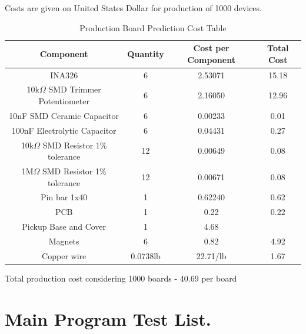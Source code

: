 Costs are given on United States Dollar for production of 1000 devices.\\
\begin{table}[htb]
  \begin{center}
    \ABNTEXreducedfont
    \caption[Production Board Prediction Cost Table]{Production Board Prediction Cost Table}
    \label{Production-cost}
    \begin{tabular}{c|c|c|c}
      \textbf{Component} & \textbf{Quantity} & \textbf{Cost per Component} & \textbf{Total Cost} \\
     \hline
     \hline
    INA326 & 6 & 2.53071 & 15.18\\ \hline
    10k$\Omega$ SMD Trimmer Potentiometer & 6 & 2.16050 & 12.96 \\ \hline
    10nF SMD Ceramic Capacitor & 6 & 0.00233 & 0.01 \\ \hline
    100nF Electrolytic Capacitor & 6 & 0.04431 & 0.27 \\ \hline
    10k$\Omega$ SMD Resistor 1$\%$ tolerance & 12 & 0.00649 & 0.08 \\ \hline
    1M$\Omega$ SMD Resistor 1$\%$ tolerance & 12 & 0.00671 & 0.08 \\ \hline
    Pin bar 1x40 & 1 & 0.62240 & 0.62 \\ \hline
    PCB & 1 & 0.22 & 0.22 \\ \hline
    Pickup Base and Cover & 1 & 4.68 \\ \hline
    Magnets & 6 & 0.82 & 4.92  \\ \hline
    Copper wire & 0.0738lb & 22.71/lb & 1.67 \\ \hline
  \end{tabular}
\end{center}
\end{table}

Total production cost considering 1000 boards - 40.69 per board

\chapter{Main Program Test List.}
\label{test-list}

